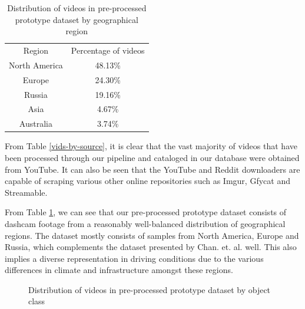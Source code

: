 \documentclass[letterpaper, 10 pt, conference]{ieeeconf}
\begin{document}
\begin{table}[!h]
    \caption{Distribution of videos in pre-processed prototype dataset by geographical region}
    \label{vids-by-region}
    \begin{center}
        \begin{tabular}{|c|c|}
            \hline
            Region & Percentage of videos \\
            North America & 48.13\% \\
            Europe & 24.30\% \\
            Russia & 19.16\% \\
            Asia & 4.67\% \\
            Australia & 3.74\% \\
            \hline
        \end{tabular}
    \end{center}
\end{table}

From Table \ref{vids-by-source}, it is clear that the vast majority of videos that have been processed through our pipeline and cataloged in our database were obtained from YouTube. It can also be seen that the YouTube and Reddit downloaders are capable of scraping various other online repositories such as Imgur, Gfycat and Streamable.

From Table \ref{vids-by-region}, we can see that our pre-processed prototype dataset consists of dashcam footage from a reasonably well-balanced distribution of geographical regions. The dataset mostly consists of samples from North America, Europe and Russia, which complements the dataset presented by Chan. et. al. \cite{chan2016anticipating} well. This also implies a diverse representation in driving conditions due to the various differences in climate and infrastructure amongst these regions.

\begin{figure}[!h]
    \centering
    \caption{Distribution of videos in pre-processed prototype dataset by object class}
    \label{fig:obj-by-class}
\end{figure}
\end{document}
